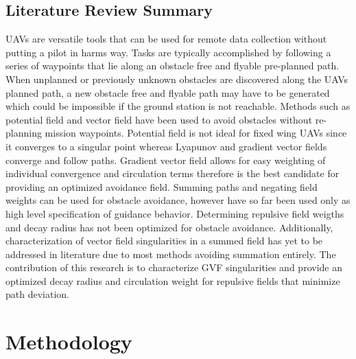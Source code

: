 \documentclass[numbered,pdftex]{ohio-etd}
\begin{document}
\section{Literature Review Summary}
UAVs are versatile tools that can be used for remote data collection without putting a pilot in harms way. Tasks are typically accomplished by following a series of waypoints that lie along an obstacle free and flyable pre-planned path. When unplanned or previously unknown obstacles are discovered along the UAVs planned path, a new obstacle free and flyable path may have to be generated which could be impossible if the ground station is not reachable. Methods such as potential field and vector field have been used to avoid obstacles without re-planning mission waypoints. Potential field is not ideal for fixed wing UAVs since it converges to a singular point whereas Lyapunov and gradient vector fields converge and follow paths. Gradient vector field allows for easy weighting of individual convergence and circulation terms therefore is the best candidate for providing an optimized avoidance field. Summing paths and negating field weights can be used for obstacle avoidance, however have so far been used only as high level specification of guidance behavior. Determining repulsive field weigths and decay radius has not been optimized for obstacle avoidance. Additionally, characterization of vector field singularities in a summed field has yet to be addressed in literature due to most methods avoiding summation entirely. The contribution of this research is to characterize GVF singularities and provide an optimized decay radius and circulation weight for repulsive fields that minimize path deviation. 

\chapter{Methodology}
\end{document}
